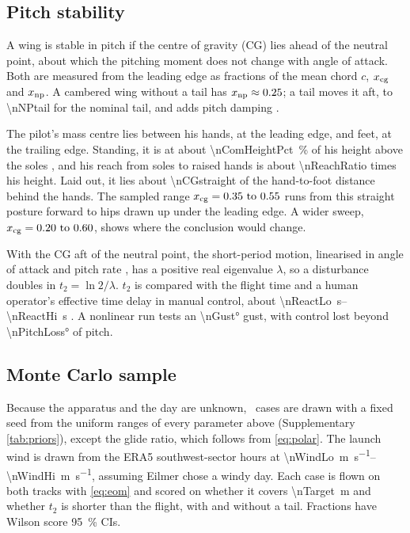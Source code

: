 \subsection{Pitch stability}

A wing is stable in pitch if the centre of gravity (CG) lies ahead of the
neutral point, about which the pitching moment does not change with angle of attack.
Both are measured from the leading edge as fractions of the mean chord \(c\), \(x_\mathrm{cg}\)
and \(x_\mathrm{np}\).
A cambered wing without a tail has \(x_\mathrm{np} \approx 0.25\); a tail moves it aft, to
\num{\nNPtail} for the nominal tail, and adds pitch damping \autocite{drela2014flight}.

The pilot's mass centre lies between his hands, at the leading edge, and feet, at the
trailing edge.
Standing, it is at about \SI{\nComHeightPct}{\percent} of his height above the soles
\autocite{winter2009biomechanics}, and his reach from soles to raised hands is about
\num{\nReachRatio} times his height.
Laid out, it lies about \num{\nCGstraight} of the hand-to-foot distance behind the hands.
The sampled range \(\cgfrac = \numrange{\nCGlo}{\nCGhi}\) runs from this straight posture
forward to hips drawn up under the leading edge.
A wider sweep, \(\cgfrac = \numrange{\nCGsweepLo}{\nCGsweepHi}\), shows where the conclusion would change.

With the CG aft of the neutral point, the short-period motion, linearised in angle of attack
and pitch rate \autocite{drela2014flight}, has a positive real eigenvalue \(\lambda\), so a
disturbance doubles in \(t_2 = \ln 2/\lambda\).
\(t_2\) is compared with the flight time and a human operator's effective
time delay in manual control, about \SIrange{\nReactLo}{\nReactHi}{\second}
\autocite{mcruer1967pilot}.
A nonlinear run tests an \ang{\nGust} gust, with control lost beyond \ang{\nPitchLoss} of pitch.

\subsection{Monte Carlo sample}

Because the apparatus and the day are unknown, \nSamples\ cases are drawn with a fixed
seed from the uniform ranges of every parameter above (Supplementary
\cref{tab:priors}), except the glide ratio, which follows from \cref{eq:polar}.
The launch wind is drawn from the ERA5 southwest-sector hours at
\SIrange{\nWindLo}{\nWindHi}{\meter\per\second}, assuming Eilmer chose a windy day.
Each case is flown on both tracks with \cref{eq:eom} and scored on whether it covers
\SI{\nTarget}{\meter} and whether \(t_2\) is shorter than the flight, with and without a tail.
Fractions have Wilson score \SI{95}{\percent} CIs.

